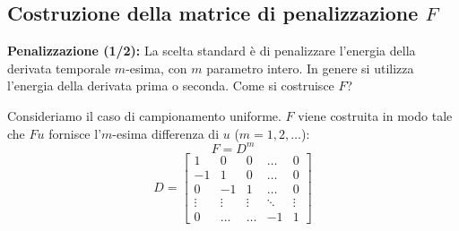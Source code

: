 \subsection{Costruzione della matrice di penalizzazione $F$}

\noindent\textbf{Penalizzazione (1/2):} La scelta standard è di penalizzare l'energia della derivata temporale $m$-esima, con $m$ parametro intero. In genere si utilizza l'energia della derivata prima o seconda. Come si costruisce $F$?

Consideriamo il caso di campionamento uniforme. $F$ viene costruita in modo tale che $Fu$ fornisce l'$m$-esima differenza di $u$ ($m = 1, 2, \dots$):
\[
    F = D^m
\]
\[
    D = \begin{bmatrix}
        1 & 0 & 0 & \dots & 0 \\
        -1 & 1 & 0 & \dots & 0 \\
        0 & -1 & 1 & \dots & 0 \\
        \vdots & \vdots & \vdots & \ddots & \vdots \\
        0 & \dots & \dots & -1 & 1
    \end{bmatrix}
\]

